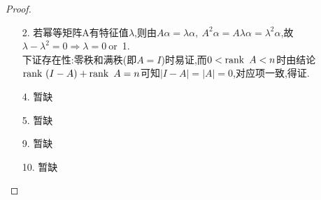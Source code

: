 \documentclass[UTF8,a4paper,notitlepage]{book}
\begin{document}
        \begin{proof}\mbox{}\begin{enumerate}
                \item[2.] 若幂等矩阵A有特征值$\lambda$,则由$A\alpha=\lambda\alpha,~A^2\alpha=A\lambda\alpha=\lambda^2\alpha$,故$\lambda-\lambda^2=0\Rightarrow\lambda=0~$or~1.\\ 
                    下证存在性:零秩和满秩(即$A=I$)时易证,而$0<\operatorname{rank}~A<n$时由结论$\operatorname{rank}~(I-A)+\operatorname{rank}~A=n$可知$|I-A|=|A|=0$,对应项一致,得证.
                \item[4.] 暂缺
                \item[5.] 暂缺
                \item[9.] 暂缺
                \item[10.] 暂缺%
        \end{enumerate}\end{proof}
\end{document}
